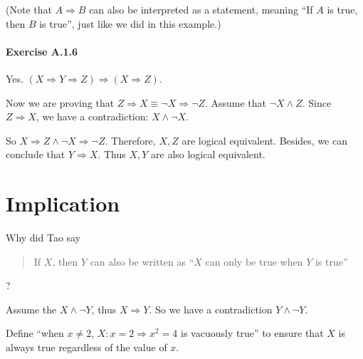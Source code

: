 (Note that $A \Longrightarrow B$ can also be interpreted as a statement, meaning ``If $A$ is true, then $B$ 
is true'', just like we did in this example.)

\paragraph{Exercise A.1.6}
\label{exercisea.1.6}
Yes. $(X \Longrightarrow Y \Longrightarrow Z) \Longrightarrow (X \Longrightarrow Z)$. 

Now we are proving that 
$Z \Longrightarrow X \equiv \neg X \Longrightarrow \neg Z$. Assume that $\neg X \wedge Z$. Since 
$Z \Longrightarrow X$, we have a contradiction: $X \wedge \neg X$.

So $X \Longrightarrow Z \wedge \neg X \Longrightarrow \neg Z$. Therefore, $X,Z$ are logical equivalent. 
Besides, we can conclude that $Y \Longrightarrow X$. Thus $X,Y$ are also logical equivalent.

\section{Implication}
Why did Tao say
\begin{quotation}
If $X$, then $Y$ can also be written as ``$X$ can only be true when $Y$ is true''
\end{quotation}?

Assume the $X \wedge \neg Y$, thus $X \Longrightarrow Y$. So we have a contradiction 
$Y \wedge \neg Y$.

Define ``when $x \neq 2$, $X:x=2 \Longrightarrow x^2=4$ is vacuously true'' to ensure that $X$ is always 
true regardless of the value of $x$.

